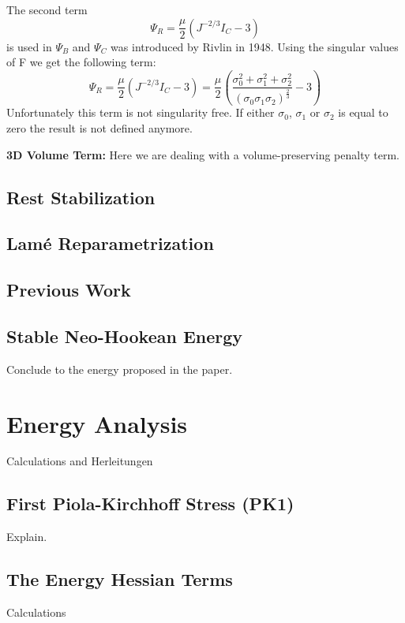 The second term 
\[
\Psi_{R} = \frac{\mu}{2}\left(J^{-2 / 3} I_{C}-3\right)
\]
is used in $\Psi_{B}$ and $\Psi_{C}$ was introduced by Rivlin in 1948. Using the singular values of F we get the following term:
\[
\Psi_{R} = \frac{\mu}{2}\left(J^{-2 / 3} I_{C}-3\right) = \frac{\mu}{2}\left(\frac{\sigma_{0}^2 + \sigma_{1}^2 + \sigma_{2}^2}{(\sigma_{0}  \sigma_{1}  \sigma_{2})^\frac{2}{3}}
 - 3\right)
\]
Unfortunately this term is not singularity free. If either $\sigma_{0}$, $\sigma_{1}$ or $\sigma_{2}$ is equal to zero the result is not defined anymore.


\textbf{3D Volume Term:} Here we are dealing with a volume-preserving penalty term. 


\subsection{Rest Stabilization}

\subsection{Lamé Reparametrization}

\subsection{Previous Work}


\subsection{Stable Neo-Hookean Energy}
Conclude to the energy proposed in the paper.

\section{Energy Analysis}
Calculations and Herleitungen

\subsection{First Piola-Kirchhoff Stress (PK1)}
Explain.

\subsection{The Energy Hessian Terms}
Calculations

